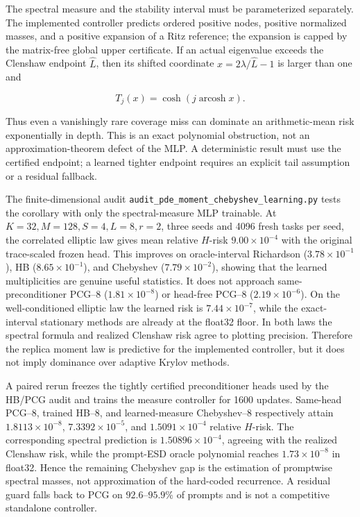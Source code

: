 \documentclass[11pt,a4paper]{article}
\theoremstyle{definition}
\begin{document}
The spectral measure and the stability interval must be parameterized
separately.  The implemented controller predicts ordered positive nodes,
positive normalized masses, and a positive expansion of a Ritz reference;
the expansion is capped by the matrix-free global upper certificate.  If an
actual eigenvalue exceeds the Clenshaw endpoint \(\widehat L\), then its
shifted coordinate \(x=2\lambda/\widehat L-1\) is larger than one and

\[
 T_j(x)=\cosh\!\left(j\operatorname{arcosh}x\right).
\]

Thus even a vanishingly rare coverage miss can dominate an arithmetic-mean
risk exponentially in depth.  This is an exact polynomial obstruction, not
an approximation-theorem defect of the MLP.  A deterministic result must use
the certified endpoint; a learned tighter endpoint requires an explicit tail
assumption or a residual fallback.

The finite-dimensional audit
\texttt{audit\_pde\_moment\_chebyshev\_learning.py} tests the corollary with
only the spectral-measure MLP trainable.  At $K=32,M=128,S=4,L=8,r=2$,
three seeds and 4096 fresh tasks per seed, the correlated elliptic law gives
mean relative $H$-risk $9.00\times10^{-4}$ with the original trace-scaled
frozen head.  This improves on
oracle-interval Richardson ($3.78\times10^{-1}$), HB
($8.65\times10^{-1}$), and Chebyshev ($7.79\times10^{-2}$), showing that
the learned multiplicities are genuine useful statistics.  It does not
approach same-preconditioner PCG--8 ($1.81\times10^{-8}$) or head-free
PCG--8 ($2.19\times10^{-6}$).  On the well-conditioned elliptic law the
learned risk is $7.44\times10^{-7}$, while the exact-interval stationary
methods are already at the float32 floor.  In both laws the spectral formula
and realized Clenshaw risk agree to plotting precision.  Therefore the
replica moment law is predictive for the implemented controller, but it does
not imply dominance over adaptive Krylov methods.

A paired rerun freezes the tightly certified preconditioner heads used by the
HB/PCG audit and trains the measure controller for 1600 updates.  Same-head
PCG--8, trained HB--8, and learned-measure Chebyshev--8 respectively attain
$1.8113\times10^{-8}$, $7.3392\times10^{-5}$, and
$1.5091\times10^{-4}$ relative $H$-risk.  The corresponding spectral
prediction is $1.50896\times10^{-4}$, agreeing with the realized Clenshaw
risk, while the prompt-ESD oracle polynomial reaches $1.73\times10^{-8}$ in
float32.  Hence the remaining Chebyshev gap is the estimation of promptwise
spectral masses, not approximation of the hard-coded recurrence.  A residual
guard falls back to PCG on $92.6$--$95.9\%$ of prompts and is not a competitive
standalone controller.
\end{document}
